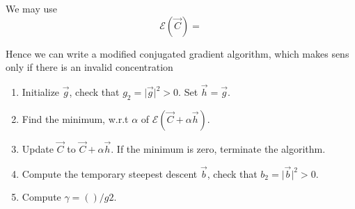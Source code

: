\documentclass[aps]{revtex4}
\begin{document}
We may use
\begin{equation}
\mathcal{E}\left(\vec{C}\right) = 
\end{equation}

Hence we can write a modified conjugated gradient algorithm, which makes sens only if there is
an invalid concentration

\begin{enumerate}
\item Initialize $\vec{g}$, check that $g_2=\vert\vec{g}\vert^2>0$. Set $\vec{h}=\vec{g}$.
\item Find the minimum, w.r.t $\alpha$ of $\mathcal{E}\left(\vec{C}+\alpha \vec{h}\right)$. 
\item Update $\vec{C}$ to $\vec{C}+\alpha\vec{h}$. If the minimum is zero, terminate the algorithm.
\item Compute the temporary steepest descent $\vec{b}$, check that $b_2=\vert\vec{b}\vert^2>0$.
\item Compute $\gamma=\left(\right)/g2$.
\end{enumerate}
\end{document}
